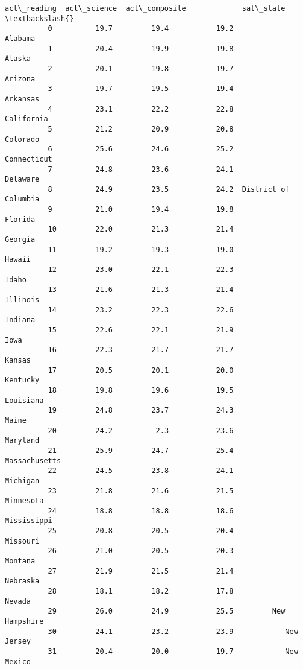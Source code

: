 \documentclass[11pt]{article}
\begin{document}
\begin{Verbatim}[commandchars=\\\{\}]
              act\_reading  act\_science  act\_composite             sat\_state  \textbackslash{}
          0          19.7         19.4           19.2               Alabama   
          1          20.4         19.9           19.8                Alaska   
          2          20.1         19.8           19.7               Arizona   
          3          19.7         19.5           19.4              Arkansas   
          4          23.1         22.2           22.8            California   
          5          21.2         20.9           20.8              Colorado   
          6          25.6         24.6           25.2           Connecticut   
          7          24.8         23.6           24.1              Delaware   
          8          24.9         23.5           24.2  District of Columbia   
          9          21.0         19.4           19.8               Florida   
          10         22.0         21.3           21.4               Georgia   
          11         19.2         19.3           19.0                Hawaii   
          12         23.0         22.1           22.3                 Idaho   
          13         21.6         21.3           21.4              Illinois   
          14         23.2         22.3           22.6               Indiana   
          15         22.6         22.1           21.9                  Iowa   
          16         22.3         21.7           21.7                Kansas   
          17         20.5         20.1           20.0              Kentucky   
          18         19.8         19.6           19.5             Louisiana   
          19         24.8         23.7           24.3                 Maine   
          20         24.2          2.3           23.6              Maryland   
          21         25.9         24.7           25.4         Massachusetts   
          22         24.5         23.8           24.1              Michigan   
          23         21.8         21.6           21.5             Minnesota   
          24         18.8         18.8           18.6           Mississippi   
          25         20.8         20.5           20.4              Missouri   
          26         21.0         20.5           20.3               Montana   
          27         21.9         21.5           21.4              Nebraska   
          28         18.1         18.2           17.8                Nevada   
          29         26.0         24.9           25.5         New Hampshire   
          30         24.1         23.2           23.9            New Jersey   
          31         20.4         20.0           19.7            New Mexico   

\end{Verbatim}
\end{document}
